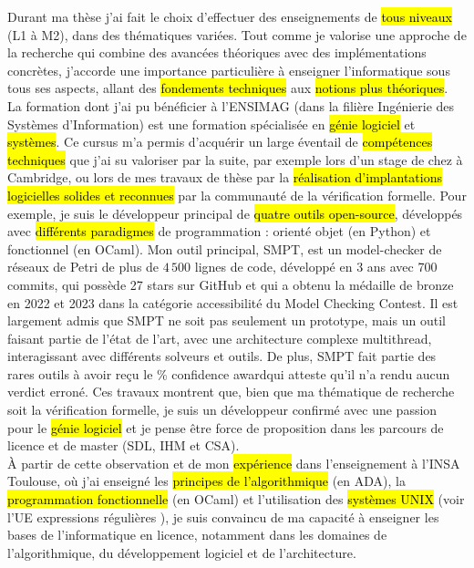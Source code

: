 \label{sec:projet_enseignement}
\vspace{10pt}

Durant ma thèse j'ai fait le choix d'effectuer des enseignements de \hl{tous
niveaux} (L1 à M2), dans des thématiques variées. Tout comme je valorise une
approche de la recherche qui combine des avancées théoriques avec des
implémentations concrètes, j'accorde une importance particulière à enseigner
l'informatique sous tous ses aspects, allant des \hl{fondements techniques} aux
\hl{notions plus théoriques}.\\

La formation dont j'ai pu bénéficier à l'ENSIMAG (dans la filière Ingénierie des
Systèmes d'Information) est une formation spécialisée en \hl{génie logiciel} et
\hl{systèmes}. Ce cursus m'a permis d'acquérir un large éventail de
\hl{compétences techniques} que j'ai su valoriser par la suite, par exemple lors
d'un stage de  chez  à Cambridge,
ou lors de mes travaux de thèse par la \hl{réalisation d'implantations
logicielles solides et reconnues} par la communauté de la vérification formelle.
Pour exemple, je suis le développeur principal de \hl{quatre outils
open-source}, développés avec \hl{différents paradigmes} de programmation :
orienté objet (en \textsf{Python}) et fonctionnel (en \textsf{OCaml}). Mon outil
principal, \textsf{SMPT}, est un model-checker de réseaux de Petri de plus de
$4\,500$ lignes de code, développé en 3 ans avec 700 commits, qui possède 27
stars sur GitHub et qui a obtenu la médaille de bronze en 2022 et 2023 dans la
catégorie \og accessibilité \fg du Model Checking Contest. Il est largement
admis que \textsf{SMPT} ne soit pas seulement un prototype, mais un outil
faisant partie de l'état de l'art, avec une architecture complexe multithread,
interagissant avec différents solveurs et outils. De plus, \textsf{SMPT} fait
partie des rares outils à avoir reçu le \% confidence award\fg qui
atteste qu'il n'a rendu aucun verdict erroné. Ces travaux montrent que, bien que
ma thématique de recherche soit la vérification formelle, je suis un développeur
confirmé avec une passion pour le \hl{génie logiciel} et je pense être force de
proposition dans les parcours de licence et de master (SDL, IHM et CSA).\\

À partir de cette observation et de mon \hl{expérience} dans l'enseignement à
l'INSA Toulouse, où j'ai enseigné les \hl{principes de l'algorithmique} (en
ADA), la \hl{programmation fonctionnelle} (en OCaml) et l'utilisation des
\hl{systèmes UNIX} (voir l'UE \og expressions régulières \fg), je suis convaincu
de ma capacité à enseigner les bases de l'informatique en licence, notamment
dans les domaines de l'algorithmique, du développement logiciel et de
l'architecture.\\

